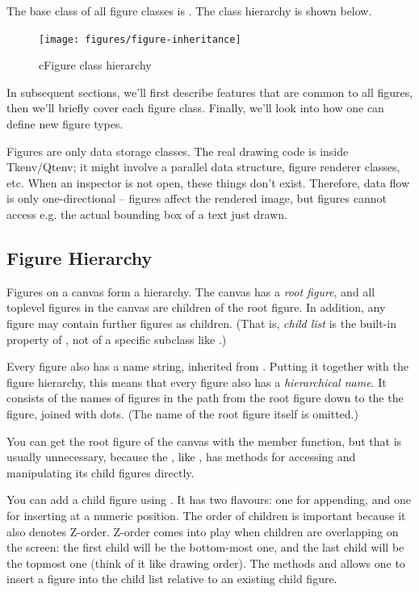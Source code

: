 The base class of all figure classes is . The class hierarchy
is shown below.

\begin{figure}[htbp]
  \begin{center}
    \texttt{[image: figures/figure-inheritance]}
    \caption{cFigure class hierarchy}
  \end{center}
\end{figure}

In subsequent sections, we'll first describe features that are common
to all figures, then we'll briefly cover each figure class. Finally,
we'll look into how one can define new figure types.

\begin{note}
Figures are only data storage classes. The real drawing code is inside
Tkenv/Qtenv; it might involve a parallel data structure, figure renderer classes, etc.
When an inspector is not open, these things don't exist. Therefore, data flow
is only one-directional -- figures affect the rendered image, but figures
cannot access e.g. the actual bounding box of a text just drawn.
\end{note}


\subsection{Figure Hierarchy}

Figures on a canvas form a hierarchy. The canvas has a \textit{root
figure}, and all toplevel figures in the canvas are children of the root
figure. In addition, any figure may contain further figures as children.
(That is, \textit{child list} is the built-in property of ,
not of a specific subclass like .)

Every figure also has a name string, inherited from .
Putting it together with the figure hierarchy, this means that every figure
also has a \textit{hierarchical name}. It consists of the names of figures
in the path from the root figure down to the the figure, joined with dots.
(The name of the root figure itself is omitted.)

You can get the root figure of the canvas with the 
member function, but that is usually unnecessary, because the
, like , has methods for accessing and
manipulating its child figures directly.

You can add a child figure using . It has two flavours: one
for appending, and one for inserting at a numeric position. The order of
children is important because it also denotes Z-order. Z-order comes into
play when children are overlapping on the screen: the first child will be
the bottom-most one, and the last child will be the topmost one (think of
it like drawing order). The methods  and
 allows one to insert a figure into the child list
relative to an existing child figure.

